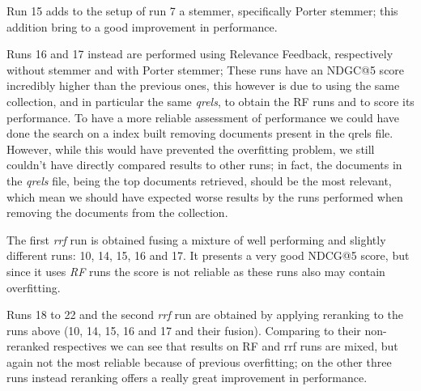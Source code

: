 Run 15 adds to the setup of run 7 a stemmer, specifically Porter stemmer; this addition bring to a good improvement in performance.

Runs 16 and 17 instead are performed using Relevance Feedback, respectively without stemmer and with Porter stemmer; These runs have an NDGC@5 score incredibly higher than the previous ones, this however is due to using the same collection, and in particular the same \textit{qrels}, to obtain the RF runs and to score its performance.
To have a more reliable assessment of performance we could have done the search on a index built removing documents present in the qrels file. However, while this would have prevented the overfitting problem, we still couldn't have directly compared results to other runs; in fact, the documents in the \textit{qrels} file, being the top documents retrieved, should be the most relevant, which mean we should have expected worse results by the runs performed when removing the documents from the collection.

The first \textit{rrf} run is obtained fusing a mixture of well performing and slightly different runs: 10, 14, 15, 16 and 17. It presents a very good NDCG@5 score, but since it uses \textit{RF} runs the score is not reliable as these runs also may contain overfitting.

Runs 18 to 22 and the second \textit{rrf} run are obtained by applying reranking to the runs above (10, 14, 15, 16 and 17 and their fusion).
Comparing to their non-reranked respectives we can see that results on RF and rrf runs are mixed, but again not the most reliable because of previous overfitting; on the other three runs instead reranking offers a really great improvement in performance.
